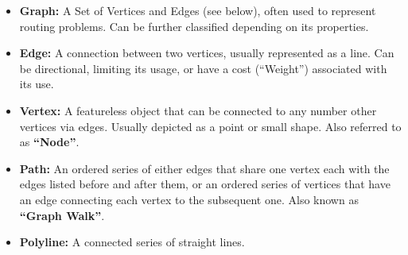 \documentclass[11pt,a4paper]{article}
\begin{document}
\begin{itemize}
 \item \textbf{Graph:} A Set of Vertices and Edges (see below), often used to represent routing problems. Can be further classified depending on its properties.
 \item \textbf{Edge:} A connection between two vertices, usually represented as a line. Can be directional, limiting its usage, or have a cost (``Weight'') associated with its use.
 \item \textbf{Vertex:} A featureless object that can be connected to any number other vertices via edges. Usually depicted as a point or small shape. Also referred to as \textbf{``Node''}.%
 \item \textbf{Path:} An ordered series of either edges that share one vertex each with the edges listed before and after them, or an ordered series of vertices that have an edge connecting each vertex to the subsequent one. Also known as \textbf{``Graph Walk''}.
 
 \item \textbf{Polyline:} A connected series of straight lines.%
 

\end{itemize}
\end{document}

